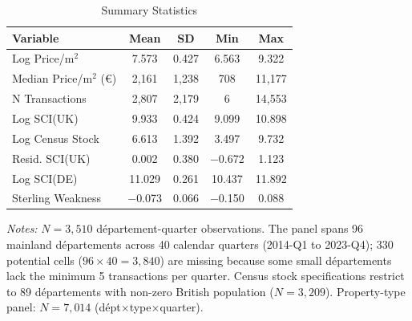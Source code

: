 \begin{table}[htbp]
\centering
\caption{Summary Statistics}
\label{tab:summary}
\begin{threeparttable}
\begin{tabular}{lcccc}
\toprule
Variable & Mean & SD & Min & Max \\
\midrule
Log Price/m$^2$ &    7.573 &    0.427 &   6.563 &     9.322 \\
Median Price/m$^2$ (\euro{}) & 2,161 & 1,238 & 708 & 11,177 \\
N Transactions & 2,807 & 2,179 &   6 & 14,553 \\
Log SCI(UK) &    9.933 &    0.424 &   9.099 &    10.898 \\
Log Census Stock &    6.613 &    1.392 &   3.497 &     9.732 \\
Resid. SCI(UK) &    0.002 &    0.380 &  $-$0.672 &     1.123 \\
Log SCI(DE) &   11.029 &    0.261 &  10.437 &    11.892 \\
Sterling Weakness &   $-$0.073 &    0.066 &  $-$0.150 &     0.088 \\
\bottomrule
\end{tabular}
\begin{tablenotes}[flushleft]\footnotesize
\item \textit{Notes:} $N = 3{,}510$ d\'{e}partement-quarter observations. The panel spans 96 mainland d\'{e}partements across 40 calendar quarters (2014-Q1 to 2023-Q4); 330 potential cells ($96 \times 40 = 3{,}840$) are missing because some small d\'{e}partements lack the minimum 5 transactions per quarter. Census stock specifications restrict to 89 d\'{e}partements with non-zero British population ($N = 3{,}209$). Property-type panel: $N = 7{,}014$ (d\'{e}pt$\times$type$\times$quarter).
\end{tablenotes}
\end{threeparttable}
\end{table}
